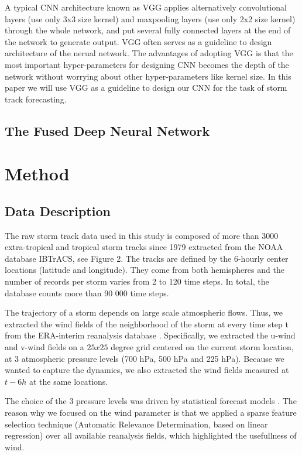A typical CNN architecture known as VGG applies alternatively convolutional layers (use only 3x3 size kernel) and maxpooling layers (use only 2x2 size kernel) through the whole network, and put several fully connected layers at the end of the network to generate output. VGG often serves as a guideline to design architecture of the nerual network. The advantages of adopting VGG is that the most important hyper-parameters for designing CNN becomes the depth of the network without worrying about other hyper-parameters like kernel size. In this paper we will use VGG as a guideline to design our CNN for the task of storm track forecasting.


\section{The Fused Deep Neural Network }




\chapter{Method}

\section{Data Description}
The raw storm track data used in this study is composed of more than 3000 extra-tropical and tropical storm tracks since 1979 extracted from the NOAA database IBTrACS\cite{knapp2010international}, see Figure 2. The tracks are defined by the 6-hourly center locations (latitude and longitude). They come from both hemispheres and the number of records per storm varies from 2 to 120 time steps. In total, the database counts more than 90 000 time steps. 

The trajectory of a storm depends on large scale atmospheric flows. Thus, we extracted the wind fields of the neighborhood of the storm at every time step t from the ERA-interim reanalysis database \cite{dee2011era}. Specifically, we extracted the u-wind and v-wind fields on a $25x25$ degree grid centered on the current storm location, at 3 atmospheric pressure levels (700 hPa, 500 hPa and 225 hPa). Because we wanted to capture the dynamics, we also extracted the wind fields measured at $t - 6h$ at the same locations.

The choice of the 3 pressure levels was driven by statistical forecast models \cite{demaria2005further}. The reason why we focused on the wind parameter is that we applied a sparse feature selection technique (Automatic Relevance Determination, based on linear regression) over all available reanalysis fields, which highlighted the usefullness of wind.


